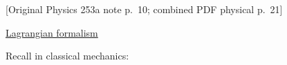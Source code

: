 %
%
%

\providecommand{\YinPageBoundary}[2]{%
  \clearpage
  \noindent\textsf{[Original Physics 253a note p.~#1; combined PDF physical p.~#2]}%
  \par\medskip
}
\providecommand{\YinLine}[1]{\noindent #1\par}
\providecommand{\YinIndent}[1]{\noindent\hspace*{2em}#1\par}
\providecommand{\YinBullet}[1]{\noindent\hspace*{1em}$\bullet$\hspace{0.7em}#1\par}
\providecommand{\YinDash}[1]{\noindent\hspace*{1em}--\hspace{0.7em}#1\par}
\providecommand{\YinBlue}[1]{{\color[rgb]{0.00,0.34,0.92}#1}}
\providecommand{\YinLightBlue}[1]{{\color[rgb]{0.47,0.67,0.82}#1}}
\providecommand{\YinPurple}[1]{{\color[rgb]{0.61,0.16,0.88}#1}}
\providecommand{\YinGray}[1]{{\color[rgb]{0.58,0.58,0.58}#1}}
\providecommand{\YinGreen}[1]{{\color[rgb]{0.00,0.52,0.22}#1}}
\providecommand{\YinRed}[1]{{\color[rgb]{0.95,0.18,0.10}#1}}
\providecommand{\YinMagenta}[1]{{\color[rgb]{0.75,0.00,0.55}#1}}
\providecommand{\YinOrange}[1]{{\color[rgb]{0.95,0.43,0.00}#1}}
\providecommand{\ket}[1]{\lvert #1\rangle}
\providecommand{\bra}[1]{\langle #1\rvert}
\providecommand{\braket}[2]{\langle #1\mid #2\rangle}

\YinPageBoundary{10}{21}

\YinLine{\underline{Lagrangian formalism}}
\YinLine{Recall in classical mechanics:}

